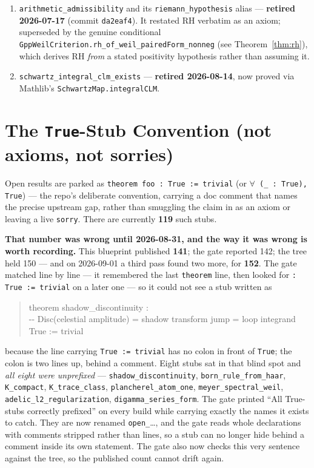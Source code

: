 \documentclass{report}
\theoremstyle{definition}
\begin{document}
\begin{itemize}
\begin{itemize}
\begin{enumerate}
  \item \texttt{arithmetic\_admissibility} and its \texttt{riemann\_hypothesis} alias ---
        \textbf{retired 2026-07-17} (commit \texttt{da2eaf4}). It restated RH verbatim as
        an axiom; superseded by the genuine conditional
        \texttt{GppWeilCriterion.rh\_of\_weil\_pairedForm\_nonneg} (see
        Theorem~\ref{thm:rh}), which derives RH \emph{from} a stated positivity
        hypothesis rather than assuming it.
  \item \texttt{schwartz\_integral\_clm\_exists} --- \textbf{retired 2026-08-14}, now proved
        via Mathlib's \texttt{SchwartzMap.integralCLM}.
\end{enumerate}

\section{The \texttt{True}-Stub Convention (not axioms, not sorries)}

Open results are parked as \texttt{theorem foo : True := trivial} (or
\texttt{$\forall$ (\_ : True), True}) --- the repo's deliberate convention, carrying a doc
comment that names the precise upstream gap, rather than smuggling the claim in as an axiom
or leaving a live \texttt{sorry}. There are currently \textbf{119} such stubs.

\medskip
\noindent\textbf{That number was wrong until 2026-08-31, and the way it was wrong is worth
recording.} This blueprint published \textbf{141}; the gate reported 142; the tree held 150 --- and
on 2026-09-01 a third pass found two more, for \textbf{152}.
The gate matched line by line --- it remembered the last \texttt{theorem} line, then looked for
\texttt{: True := trivial} on a later one --- so it could not see a stub written as
\begin{quote}\ttfamily
theorem shadow\_discontinuity :\\
\hspace*{2em}-{}- Disc(celestial amplitude) = shadow transform jump = loop integrand\\
\hspace*{2em}True := trivial
\end{quote}
because the line carrying \texttt{True := trivial} has no colon in front of \texttt{True}; the
colon is two lines up, behind a comment. Eight stubs sat in that blind spot and \emph{all eight
were unprefixed} --- \texttt{shadow\_discontinuity}, \texttt{born\_rule\_from\_haar},
\texttt{K\_compact}, \texttt{K\_trace\_class}, \texttt{plancherel\_atom\_one},
\texttt{meyer\_spectral\_weil}, \texttt{adelic\_l2\_regularization},
\texttt{digamma\_series\_form}. The gate printed ``All True-stubs correctly prefixed'' on every
build while carrying exactly the names it exists to catch. They are now renamed
\texttt{open\_}\ldots, and the gate reads whole declarations with comments stripped rather than
lines, so a stub can no longer hide behind a comment inside its own statement. The gate also now
checks this very sentence against the tree, so the published count cannot drift again.


\end{itemize}
\end{itemize}
\end{document}
